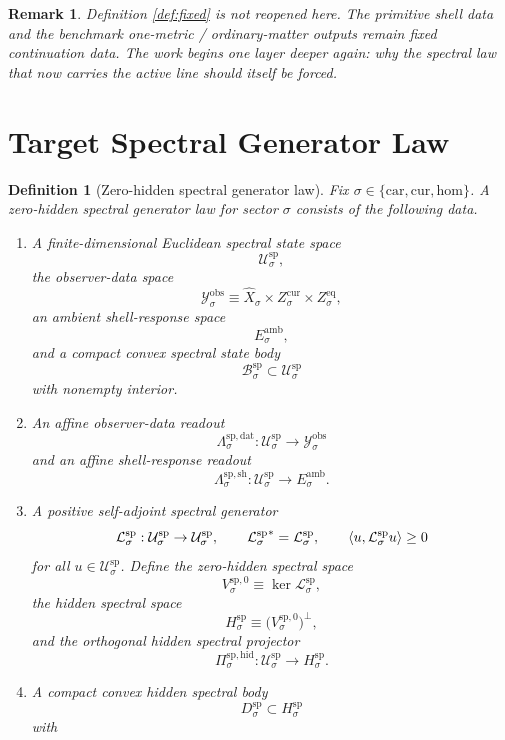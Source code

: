 \documentclass[11pt]{article}
\newcommand{\Car}{\mathrm{car}}
\newcommand{\Cur}{\mathrm{cur}}
\newcommand{\Hom}{\mathrm{hom}}
\newcommand{\VisibleAffine}[1]{\widehat X_{#1}}
\newcommand{\DataSpace}[1]{\mathcal Y_{#1}^{\mathrm{obs}}}
\newcommand{\AmbientTarget}[1]{E_{#1}^{\mathrm{amb}}}
\newcommand{\SpecSpace}[1]{\mathcal U_{#1}^{\mathrm{sp}}}
\newcommand{\SpecBody}[1]{\mathcal B_{#1}^{\mathrm{sp}}}
\newcommand{\SpecData}[1]{\Lambda_{#1}^{\mathrm{sp,dat}}}
\newcommand{\SpecShell}[1]{\Lambda_{#1}^{\mathrm{sp,sh}}}
\newcommand{\SpecOp}[1]{\mathcal L_{#1}^{\mathrm{sp}}}
\newcommand{\SpecZero}[1]{V_{#1}^{\mathrm{sp},0}}
\newcommand{\SpecHidden}[1]{H_{#1}^{\mathrm{sp}}}
\newcommand{\SpecHiddenBody}[1]{D_{#1}^{\mathrm{sp}}}
\newcommand{\SpecProj}[1]{\Pi_{#1}^{\mathrm{sp,hid}}}
\newtheorem{definition}{Definition}
\newtheorem{remark}{Remark}
\begin{document}
\begin{remark}
Definition \ref{def:fixed} is not reopened here. The primitive shell data and the benchmark one-metric / ordinary-matter outputs remain fixed continuation data. The work begins one layer deeper again: why the spectral law that now carries the active line should itself be forced.
\end{remark}

\section{Target Spectral Generator Law}

\begin{definition}[Zero-hidden spectral generator law]
\label{def:spectral}
Fix \(\sigma\in\{\Car,\Cur,\Hom\}\). A \emph{zero-hidden spectral generator law} for sector \(\sigma\) consists of the following data.
\begin{enumerate}
    \item A finite-dimensional Euclidean spectral state space
    \[
    \SpecSpace{\sigma},
    \]
    the observer-data space
    \[
    \DataSpace{\sigma}
    \equiv
    \VisibleAffine{\sigma}\times Z_{\sigma}^{\mathrm{cur}}\times Z_{\sigma}^{\mathrm{eq}},
    \]
    an ambient shell-response space
    \[
    \AmbientTarget{\sigma},
    \]
    and a compact convex spectral state body
    \[
    \SpecBody{\sigma}\subset\SpecSpace{\sigma}
    \]
    with nonempty interior.
    \item An affine observer-data readout
    \[
    \SpecData{\sigma}:\SpecSpace{\sigma}\to\DataSpace{\sigma}
    \]
    and an affine shell-response readout
    \[
    \SpecShell{\sigma}:\SpecSpace{\sigma}\to\AmbientTarget{\sigma}.
    \]
    \item A positive self-adjoint spectral generator
    \[
    \SpecOp{\sigma}:\SpecSpace{\sigma}\to\SpecSpace{\sigma},
    \qquad
    {\SpecOp{\sigma}}^{*}=\SpecOp{\sigma},
    \qquad
    \ev{u,\SpecOp{\sigma}u}\ge 0
    \]
    for all \(u\in\SpecSpace{\sigma}\). Define the zero-hidden spectral space
    \[
    \SpecZero{\sigma}\equiv\ker\SpecOp{\sigma},
    \]
    the hidden spectral space
    \[
    \SpecHidden{\sigma}
    \equiv
    \bigl(\SpecZero{\sigma}\bigr)^{\perp},
    \]
    and the orthogonal hidden spectral projector
    \[
    \SpecProj{\sigma}:\SpecSpace{\sigma}\to\SpecHidden{\sigma}.
    \]
    \item A compact convex hidden spectral body
    \[
    \SpecHiddenBody{\sigma}\subset\SpecHidden{\sigma}
    \]
    with
    \[
\]
\end{enumerate}
\end{definition}
\end{document}
